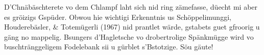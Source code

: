 \documentclass[12pt]{sigbovik-review}
\author{Hans-Peter Rüdisühli, Jasskönig vo de mittlere und vierte Schattegibeleggtäli}
\begin{document}
\maketitle

D'Chnäbäschterete vo dem Chlampf laht sich nid ring zämefasse, düecht mi aber es gröizigs Gspüder. Obwou hie wichtigi Erkenntnis us Schöppelimunggi, Houderebäsler, \& Totemügerli (1967) nid prantlet wärde, gstabets guet gfroorig u gäng no mappelig. Bsungers d'Hagletsche vo drobertrolige Spänkmügge wird vo buschtränggeligem Fodelebank sii u gürblet s'Bstotzige. Söu gäute!
\end{document}

